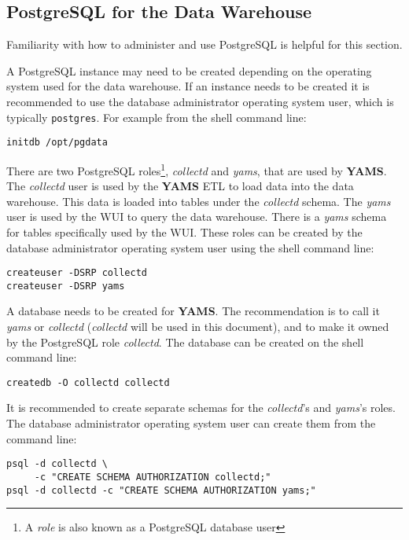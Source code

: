 \documentclass[a4paper,twoside,12pt]{article}
\begin{document}
\subsection{PostgreSQL for the Data Warehouse}

Familiarity with how to administer and use PostgreSQL is helpful for this
section.

A PostgreSQL instance may need to be created depending on the operating system
used for the data warehouse.  If an instance needs to be created it is
recommended to use the database administrator operating system user, which is
typically \texttt{postgres}.  For example from the shell command line:
\lstset{language=sh}
\begin{lstlisting}
initdb /opt/pgdata
\end{lstlisting}

There are two PostgreSQL roles\footnote{A \textit{role} is also known as a
PostgreSQL database user}, \textit{collectd} and \textit{yams}, that are used
by \textbf{YAMS}.  The \textit{collectd} user is used by the \textbf{YAMS} ETL
to load data into the data warehouse.  This data is loaded into tables under
the \textit{collectd} schema.  The \textit{yams} user is used by the WUI to
query the data warehouse.  There is a \textit{yams} schema for tables
specifically used by the WUI.  These roles can be created by the database
administrator operating system user using the shell command line:
\lstset{language=sh}
\begin{lstlisting}
createuser -DSRP collectd
createuser -DSRP yams
\end{lstlisting}

A database needs to be created for \textbf{YAMS}.  The recommendation is to
call it \textit{yams} or \textit{collectd} (\textit{collectd} will be used in
this document), and to make it owned by the PostgreSQL role \textit{collectd}.
The database can be created on the shell command line:
\lstset{language=sh}
\begin{lstlisting}
createdb -O collectd collectd
\end{lstlisting}

It is recommended to create separate schemas for the \textit{collectd}'s and
\textit{yams}'s roles.  The database administrator operating system user can
create them from the command line:
\lstset{language=sh}
\begin{lstlisting}
psql -d collectd \
     -c "CREATE SCHEMA AUTHORIZATION collectd;"
psql -d collectd -c "CREATE SCHEMA AUTHORIZATION yams;"
\end{lstlisting}
\end{document}
